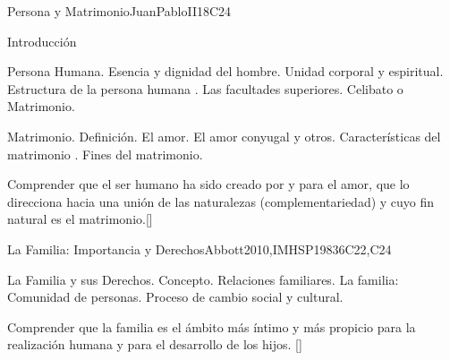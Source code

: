 \begin{syllabus}
\begin{outcomes}
    \item {}
    \item {}
\end{outcomes}
\begin{competences}
    \item {}
    \item {}
\end{competences}

\begin{unit}{}{Persona y Matrimonio}{JuanPabloII}{18}{C24}
\begin{topics}
	\item Introducción 
	\item Persona Humana.
		\subitem Esencia y dignidad del hombre.
		\subitem Unidad corporal y espiritual.
		\subitem Estructura de la persona humana .
		\subitem Las facultades superiores.
		\subitem Celibato o Matrimonio.
	\item Matrimonio.
		\subitem Definición.
		\subitem El amor.
		\subitem El amor conyugal y otros.
		\subitem Características del matrimonio .
		\subitem Fines del matrimonio.
\end{topics}

\begin{learningoutcomes}
	\item Comprender que el ser humano ha sido creado por y para el amor, que lo direcciona hacia una unión de las naturalezas (complementariedad) y cuyo fin natural es el matrimonio.[\Familiarity]
\end{learningoutcomes}
\end{unit}

\begin{unit}{}{La Familia: Importancia y Derechos}{Abbott2010,IMHSP1983}{6}{C22,C24}
\begin{topics}
	\item La Familia y sus Derechos.
		\subitem Concepto. 
		\subitem Relaciones familiares. 
		\subitem La familia: Comunidad de personas. 
		\subitem Proceso de cambio social y cultural. 
\end{topics}

\begin{learningoutcomes}
	\item Comprender que la familia es el ámbito más íntimo y más propicio para la realización humana y para el desarrollo de los hijos. [\Familiarity]
\end{learningoutcomes}
\end{unit}


\end{syllabus}
